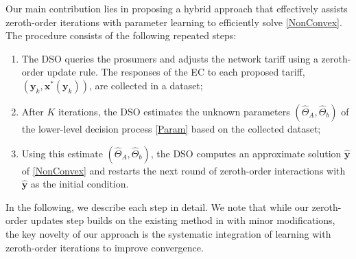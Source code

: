 \documentclass[letterpaper, 10 pt, conference]{ieeeconf}
\newcommand\xbf{\mathbf{x}}
\newcommand\ybf{\mathbf{y}}
\begin{document}
Our main contribution lies in proposing a hybrid approach that effectively assists zeroth-order iterations with parameter learning to efficiently solve \eqref{NonConvex}. The procedure consists of the following repeated steps:
\begin{enumerate}[label=\alph*)]
\item The DSO queries the prosumers and adjusts the network tariff using a zeroth-order update rule. The responses of the EC to each proposed tariff, $\left (\ybf_k, \xbf^*(\ybf_k)\right)$, are collected in a dataset;
\item After $K$ iterations, the DSO estimates the unknown parameters $(\hat{\Theta}_A, \hat{\Theta}_b)$ of the lower-level decision process \eqref{Param} based on the collected dataset;
\item Using this estimate $(\hat{\Theta}_A, \hat{\Theta}_b)$, the DSO computes an approximate solution $\hat{\ybf}$ of \eqref{NonConvex} and restarts the next round of zeroth-order interactions with $\hat{\ybf}$ as the initial condition.
\end{enumerate}

In the following, we describe each step in detail. We note that while our zeroth-order updates step builds on the existing method in \cite{maheshwari2024follower} with minor modifications, the key novelty of our approach is the systematic integration of learning with zeroth-order iterations to improve convergence.
\end{document}
